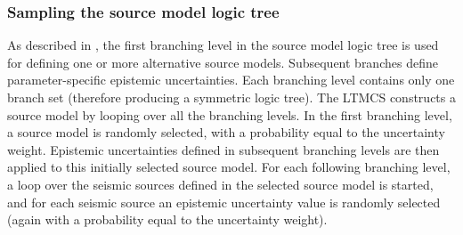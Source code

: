 \subsubsection{Sampling the source model logic tree}
As described in \label{hazard:source_model_logic_tree}, the first branching level in the source model logic tree is used for defining one or more alternative source models. Subsequent branches define parameter-specific epistemic uncertainties. Each branching level contains only one branch set (therefore producing a symmetric logic tree). The LTMCS constructs a source model by looping over all the branching levels. In the first branching level, a source model is randomly selected, with a probability equal to the uncertainty weight. Epistemic uncertainties defined in subsequent branching levels are then applied to this initially selected source model. For each following branching level, a loop over the seismic sources defined in the selected source model is started, and for each seismic source an epistemic uncertainty value is randomly selected (again with a probability equal to the uncertainty weight).